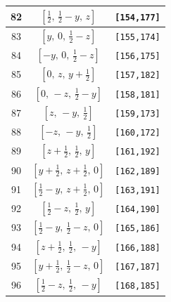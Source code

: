 \documentclass[fleqn,8pt]{jsarticle}
\begin{document}
\begin{longtable}{ccc}
82 & $\left[ \frac{1}{2},\, \frac{1}{2} - y,\, z \right]$ & {\tt [154,177]} \\ \hline
83 & $\left[ y,\, 0,\, \frac{1}{2} - z \right]$ & {\tt [155,174]} \\ \hline
84 & $\left[ - y,\, 0,\, \frac{1}{2} - z \right]$ & {\tt [156,175]} \\ \hline
85 & $\left[ 0,\, z,\, y + \frac{1}{2} \right]$ & {\tt [157,182]} \\ \hline
86 & $\left[ 0,\, - z,\, \frac{1}{2} - y \right]$ & {\tt [158,181]} \\ \hline
87 & $\left[ z,\, - y,\, \frac{1}{2} \right]$ & {\tt [159,173]} \\ \hline
88 & $\left[ - z,\, - y,\, \frac{1}{2} \right]$ & {\tt [160,172]} \\ \hline
89 & $\left[ z + \frac{1}{2},\, \frac{1}{2},\, y \right]$ & {\tt [161,192]} \\ \hline
90 & $\left[ y + \frac{1}{2},\, z + \frac{1}{2},\, 0 \right]$ & {\tt [162,189]} \\ \hline
91 & $\left[ \frac{1}{2} - y,\, z + \frac{1}{2},\, 0 \right]$ & {\tt [163,191]} \\ \hline
92 & $\left[ \frac{1}{2} - z,\, \frac{1}{2},\, y \right]$ & {\tt [164,190]} \\ \hline
93 & $\left[ \frac{1}{2} - y,\, \frac{1}{2} - z,\, 0 \right]$ & {\tt [165,186]} \\ \hline
94 & $\left[ z + \frac{1}{2},\, \frac{1}{2},\, - y \right]$ & {\tt [166,188]} \\ \hline
95 & $\left[ y + \frac{1}{2},\, \frac{1}{2} - z,\, 0 \right]$ & {\tt [167,187]} \\ \hline
96 & $\left[ \frac{1}{2} - z,\, \frac{1}{2},\, - y \right]$ & {\tt [168,185]} \\
\end{longtable}
\renewcommand{\arraystretch}{1.2}
\end{document}

